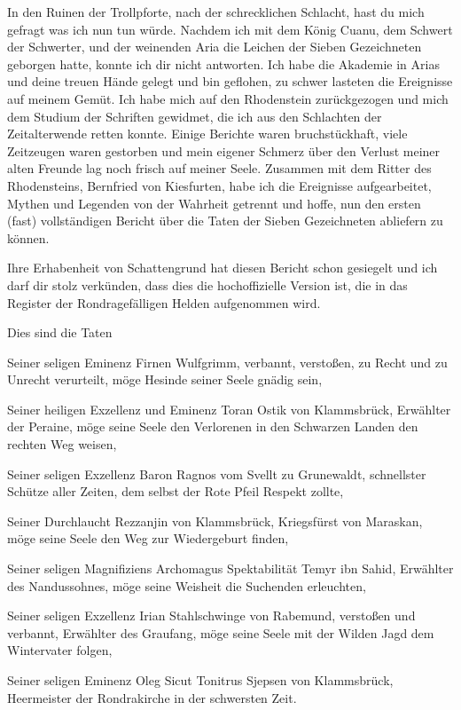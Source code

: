 In den Ruinen der Trollpforte, nach der schrecklichen Schlacht, hast du mich gefragt was ich nun tun würde. Nachdem ich mit dem König Cuanu, dem Schwert der Schwerter, und der weinenden Aria die Leichen der Sieben Gezeichneten geborgen hatte, konnte ich dir nicht antworten. Ich habe die Akademie in Arias und deine treuen Hände gelegt und bin geflohen, zu schwer lasteten die Ereignisse auf meinem Gemüt. Ich habe mich auf den Rhodenstein zurückgezogen und mich dem Studium der Schriften gewidmet, die ich aus den Schlachten der Zeitalterwende retten konnte. Einige Berichte waren bruchstückhaft, viele Zeitzeugen waren gestorben und mein eigener Schmerz über den Verlust meiner alten Freunde lag noch frisch auf meiner Seele. Zusammen mit dem Ritter des Rhodensteins, Bernfried von Kiesfurten, habe ich die Ereignisse aufgearbeitet, Mythen und Legenden von der Wahrheit getrennt und hoffe, nun den ersten (fast) vollständigen Bericht über die Taten der Sieben Gezeichneten abliefern zu können.

Ihre Erhabenheit von Schattengrund hat diesen Bericht schon gesiegelt und ich darf dir stolz verkünden, dass dies die hochoffizielle Version ist, die in das Register der Rondragefälligen Helden aufgenommen wird.

Dies sind die Taten

Seiner seligen Eminenz Firnen Wulfgrimm, verbannt, verstoßen, zu Recht und zu Unrecht verurteilt, möge Hesinde seiner Seele gnädig sein,\par\smallskip
Seiner heiligen Exzellenz und Eminenz Toran Ostik von Klammsbrück, Erwählter der Peraine, möge seine Seele den Verlorenen in den Schwarzen Landen den rechten Weg weisen,\par\smallskip
Seiner seligen Exzellenz Baron Ragnos vom Svellt zu Grunewaldt, schnellster Schütze aller Zeiten, dem selbst der Rote Pfeil  Respekt zollte,\par\smallskip
Seiner Durchlaucht Rezzanjin von Klammsbrück, Kriegsfürst von Maraskan, möge seine Seele den Weg zur Wiedergeburt finden,\par\smallskip
Seiner seligen Magnifiziens Archomagus Spektabilität Temyr ibn Sahid, Erwählter des Nandussohnes, möge seine Weisheit die Suchenden erleuchten,\par\smallskip
Seiner seligen Exzellenz Irian Stahlschwinge von Rabemund, verstoßen und verbannt, Erwählter des Graufang, möge seine Seele mit der Wilden Jagd dem Wintervater folgen,\par\smallskip
Seiner seligen Eminenz Oleg Sicut Tonitrus Sjepsen von Klammsbrück, Heermeister der Rondrakirche in der schwersten Zeit.

